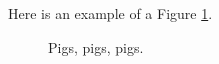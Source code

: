 
Here is an example of a Figure \ref{fig:fig}.

\begin{figure}[!ht]
  \centering
  \caption[This is a special label, used only in the List of Figures]
          {Pigs, pigs, pigs.}
  \label{fig:fig}
\end{figure}
